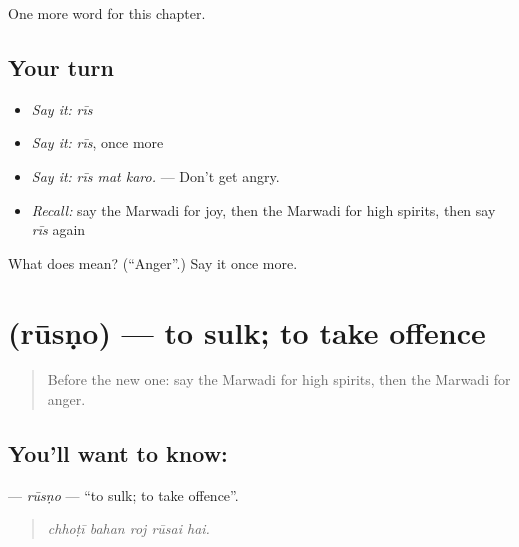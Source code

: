 \begin{grammarlens}[title={What you've built}]
One more word for this chapter.
\end{grammarlens}

\subsection*{Your turn}
\begin{itemize}
\raggedright
  \item \emph{Say it:} \emph{rīs}
  \item \emph{Say it:} \emph{rīs}, once more
  \item \emph{Say it:} \emph{rīs mat karo.} — Don't get angry.
  \item \emph{Recall:} say the Marwadi for joy, then the Marwadi for high spirits, then say \emph{rīs} again
\end{itemize}

\begin{tcolorbox}[breakable,colback=teal!4,colframe=teal!35!black,title={Before you move on}]
What does  mean? (\textquotedblleft{}Anger\textquotedblright{}.) Say it once more.
\end{tcolorbox}
\section[\texorpdfstring{\mw{रूसणो} (rūsṇo)}{रूसणो (rūsṇo)}]{ (rūsṇo) — to sulk; to take offence}

\label{lesson:MW-C257-rusno}



\begin{quote}
Before the new one: say the Marwadi for high spirits, then the Marwadi for anger.
\end{quote}

\subsection*{You'll want to know: }
\textbf{} — \emph{rūsṇo} — \textquotedblleft{}to sulk; to take offence\textquotedblright{}.

\begin{quote}
    
\end{quote}

\begin{quote}
\emph{chhoṭī bahan roj rūsai hai.}
\end{quote}

